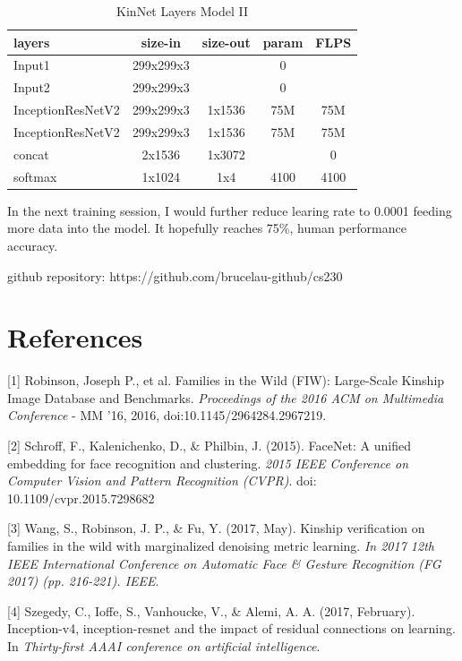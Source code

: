\documentclass{article}
\begin{document}
\begin{table}[h]
	\centering
	\begin{tabular}{ | l | c | c | c | c |}
		\hline
		\textbf{layers}&\textbf{size-in}&\textbf{size-out}&\textbf{param}&\textbf{FLPS}\\
		\hline
			Input1 & 299x299x3 & & 0 & \\
			Input2 & 299x299x3 & & 0 & \\
			InceptionResNetV2 & 299x299x3 & 1x1536 & 75M & 75M \\
			InceptionResNetV2 & 299x299x3 & 1x1536 & 75M & 75M \\
			concat & 2x1536 & 1x3072 & & 0 \\
			softmax & 1x1024 & 1x4 & 4100 & 4100 \\
		\hline
	\end{tabular}
	\caption{KinNet Layers Model II}
	\label{table:3}
\end{table}

In the next training session, I would further reduce learing rate to 0.0001 feeding more data into the model. It hopefully reaches 75\%, human performance accuracy.

github repository: https://github.com/brucelau-github/cs230

\newpage
\section*{References}
\medskip
\small
[1] Robinson, Joseph P., et al. Families in the Wild (FIW): Large-Scale Kinship
Image Database and Benchmarks. {\it Proceedings of the 2016 ACM on Multimedia
Conference} - MM '16, 2016, doi:10.1145/2964284.2967219.

[2] Schroff, F., Kalenichenko, D., \& Philbin, J. (2015). FaceNet: A unified
embedding for face recognition and clustering. {\it 2015 IEEE Conference on
Computer Vision and Pattern Recognition (CVPR)}. doi: 10.1109/cvpr.2015.7298682

[3] Wang, S., Robinson, J. P., \& Fu, Y. (2017, May). Kinship verification on
families in the wild with marginalized denoising metric learning. {\it In 2017 12th
IEEE International Conference on Automatic Face \& Gesture Recognition (FG 2017)
(pp. 216-221). IEEE}.

[4] Szegedy, C., Ioffe, S., Vanhoucke, V., \& Alemi, A. A. (2017, February).
Inception-v4, inception-resnet and the impact of residual connections on
learning. In {\it Thirty-first AAAI conference on artificial intelligence}.
\end{document}
